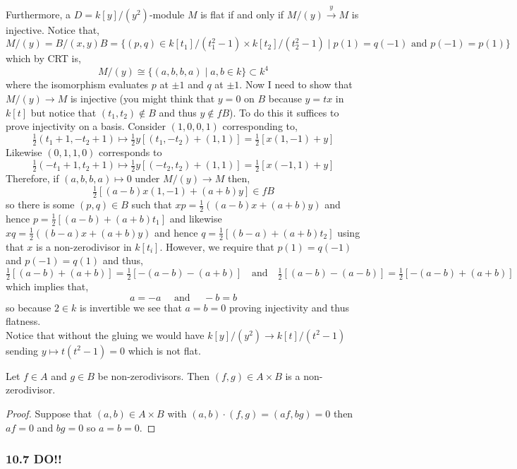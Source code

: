 \documentclass[12pt]{article}
\begin{document}
Furthermore, a $D = k[y]/(y^2)$-module $M$ is flat if and only if $M/(y) \xrightarrow{y} M$ is injective. Notice that,
\[ M/(y) = B / (x,y)B = \{ (p,q) \in k[t_1] / (t_1^2 - 1) \times k[t_2] / (t_2^2 - 1) \mid p(1) = q(-1) \text{ and } p(-1) = p(1) \} \]
which by CRT is,
\[ M/(y) \cong \{ (a,b,b,a) \mid a,b \in k \} \subset k^4 \]
where the isomorphism evaluates $p$ at $\pm 1$ and $q$ at $\pm 1$. 
Now I need to show that $M/(y) \to M$ is injective (you might think that $y = 0$ on $B$ because $y = t x$ in $k[t]$ but notice that $(t_1, t_2) \notin B$ and thus $y \notin f B$). To do this it suffices to prove injectivity on a basis. Consider $(1,0,0,1)$ corresponding to, 
\[ \tfrac{1}{2} (t_1 + 1, -t_2 + 1) \mapsto \tfrac{1}{2} y [(t_1, -t_2) + (1,1)] = \tfrac{1}{2} [ x (1,-1) + y ] \]
Likewise $(0, 1, 1, 0)$ corresponds to
\[ \tfrac{1}{2} (-t_1 + 1, t_2 + 1) \mapsto \tfrac{1}{2} y [(-t_2, t_2) + (1,1)] = \tfrac{1}{2} [x(-1, 1) + y] \]
Therefore, if $(a,b,b,a) \mapsto 0$ under $M/(y) \to M$ then,
\[ \tfrac{1}{2} [(a - b) x (1, -1) + (a + b) y ] \in f B \]
so there is some $(p,q) \in B$ such that $xp = \tfrac{1}{2} ((a - b) x + (a + b) y)$ and hence $p = \tfrac{1}{2} [(a - b) + (a + b) t_1]$ and likewise $xq = \tfrac{1}{2}((b-a) x + (a + b) y)$ and hence $q = \tfrac{1}{2} [(b - a) + (a + b) t_2]$ using that $x$ is a non-zerodivisor in $k[t_i]$. However, we require that $p(1) = q(-1)$ and $p(-1) = q(1)$ and thus,
\[ \tfrac{1}{2} [(a - b) + (a + b)] = \tfrac{1}{2} [-(a - b) - (a + b)] \quad \text{and} \quad \tfrac{1}{2}[(a - b) - (a - b)] = \tfrac{1}{2}[-(a - b) + (a + b)] \] 
which implies that,
\[ a = - a \quad \text{ and } \quad - b = b \]
so because $2 \in k$ is invertible we see that $a = b = 0$ proving injectivity and thus flatness.
\bigskip\\
Notice that without the gluing we would have $k[y]/(y^2) \to k[t]/(t^2 - 1)$ sending $y \mapsto t(t^2 - 1) = 0$ which is not flat.


\begin{lemma}
Let $f \in A$ and $g \in B$ be non-zerodivisors. Then $(f,g) \in A \times B$ is a non-zerodivisor.
\end{lemma}

\begin{proof}
Suppose that $(a,b) \in A \times B$ with $(a,b) \cdot (f,g) = (af, bg) = 0$ then $af = 0$ and $bg = 0$ so $a = b = 0$.
\end{proof}

\subsubsection{10.7 DO!!}
\end{document}
